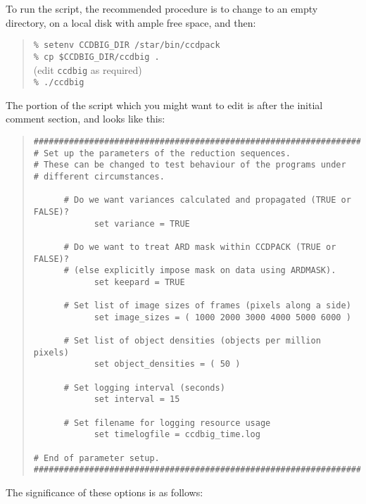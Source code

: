 To run the script, the recommended procedure is
to change to an empty directory, on a local disk with 
ample free space, and then:
\begin{quote}
\verb"% setenv CCDBIG_DIR /star/bin/ccdpack" \\
\verb"% cp $CCDBIG_DIR/ccdbig ." \\
\hspace*{3em} (edit {\tt ccdbig} as required) \\
\verb"% ./ccdbig"
\end{quote}
The portion of the script which you might want to edit 
is after the initial comment section, and looks like this:
\begin{quote}
\begin{verbatim}
###################################################################
# Set up the parameters of the reduction sequences.
# These can be changed to test behaviour of the programs under
# different circumstances.

      # Do we want variances calculated and propagated (TRUE or FALSE)?
            set variance = TRUE

      # Do we want to treat ARD mask within CCDPACK (TRUE or FALSE)?
      # (else explicitly impose mask on data using ARDMASK).
            set keepard = TRUE

      # Set list of image sizes of frames (pixels along a side)
            set image_sizes = ( 1000 2000 3000 4000 5000 6000 )

      # Set list of object densities (objects per million pixels)
            set object_densities = ( 50 )

      # Set logging interval (seconds)
            set interval = 15

      # Set filename for logging resource usage
            set timelogfile = ccdbig_time.log

# End of parameter setup.
###################################################################
\end{verbatim}
\end{quote}
The significance of these options is as follows:
